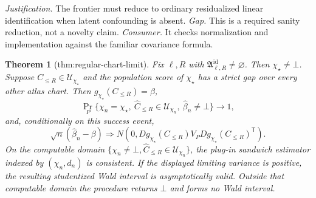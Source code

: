 \documentclass{article}
\newtheorem{theorem}{Theorem}
\begin{document}
\par\smallskip\noindent \textit{Justification.} The frontier must reduce to ordinary residualized linear identification when latent confounding is absent. \textit{Gap.} This is a required sanity reduction, not a novelty claim. \textit{Consumer.} It checks normalization and implementation against the familiar covariance formula.

\begin{theorem}[thm:regular-chart-limit]\label{thm:regular-chart-limit}
Fix \(\ell,R\) with \(\mathfrak A^{\mathrm{id}}_{\ell,R}\ne\varnothing\).  Then \(\chi_\star\ne\bot\).  Suppose \(C_{\le R}\in\mathcal U_{\chi_\star}\) and the population score of \(\chi_\star\) has a strict gap over every other atlas chart.  Then \(g_{\chi_\star}(C_{\le R})=\beta\),
\[
 \Pr_P\{\chi_n=\chi_\star,\ \widehat C_{\le R}\in\mathcal U_{\chi_n},\ \widehat\beta_n\ne\bot\}\longrightarrow1,
\]
and, conditionally on this success event,
\[
 \sqrt n(\widehat\beta_n-\beta)\Rightarrow
 N\!\left(0,Dg_{\chi_\star}(C_{\le R})V_PDg_{\chi_\star}(C_{\le R})^{\mathsf T}\right).
\]
On the computable domain \(\{\chi_n\ne\bot,\widehat C_{\le R}\in\mathcal U_{\chi_n}\}\), the plug-in sandwich estimator indexed by \((\chi_n,d_n)\) is consistent.  If the displayed limiting variance is positive, the resulting studentized Wald interval is asymptotically valid.  Outside that computable domain the procedure returns \(\bot\) and forms no Wald interval.
\end{theorem}
\end{document}
